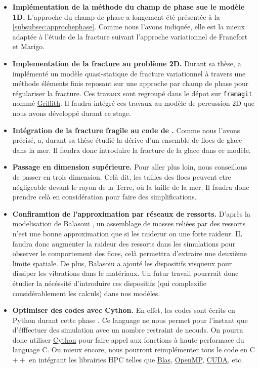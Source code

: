 \begin{itemize}
    \item \textbf{Implémentation de la méthode du champ de phase sue le modèle 1D.} L'approche du champ de phase a longement été présentée à la \cref{subsubsec:approchephase}. Comme nous l'avons indiquée, elle est la mieux adaptée à l'étude de la fracture suivant l'approche variationnel de Francfort et Marigo.
    \item \textbf{Implementation de la fracture au problème 2D.} Durant sa thèse, \citeauthor{balasoiu2020halthesis} a implémenté un modèle quasi-statique de fracture variationnel à travers une méthode éléments finis reposant sur une approche par champ de phase pour régulariser la fracture. Ces travaux sont regroupé dans le dépot sur \texttt{framagit} nommé \href{https://framagit.org/RaK/Griffith}{Griffith}. Il faudra intégré ces travaux au modèle de percussion 2D que nous avons développé durant ce stage.
    \item \textbf{Intégration de la fracture fragile au code de \citeauthor{rabatel2015thesis}.} Comme nous l'avons précisé, \citeauthor{rabatel2015thesis} a, durant sa thèse étudié la dérive d'un ensemble de floes de glace dans la mer. Il faudra donc introduire la fracture de la glace dans ce modèle.
    \item \textbf{Passage en dimension supérieure.} Pour aller plus loin, nous conseillons de passer en trois dimension. Celà dit, les tailles des floes peuvent etre négligeable devant le rayon de la Terre, où la taille de la mer. Il faudra donc prendre celà en considération pour faire des simplifications.
    \item \textbf{Confiramtion de l'approximation par réseaux de ressorts.} D'après la modelisation de Balasoui \parencite{balasoiu2020halthesis}, un assemblage de masses reliées par des ressorts n'est une bonne approximation que si les raiderur on une forte raideur. IL faudra donc augmenter la raideur des ressorts dans les simulations pour observer le comportement des floes, celà permettra d'extraire une deuxième limite spatiale. De plus, Balasoiu a ajouté les dispositifs visqueux pour dissiper les vibrations dans le matériaux. Un futur travail pourrrait donc étudier la nécéssité d'introduire ces dispositifs (qui complexifie considérablement les calculs) dans nos modèles.  
    \item \textbf{Optimiser des codes avec Cython.} En effet, les codes sont écrits en Python durant cette phase . Ce language ne nous permet pour l'instant que d'éfffectuer des simulation avec un nombre restraint de neouds. On pourra donc utiliser \href{https://cython.org/}{Cython} pour faire appel aux fonctions à haute performace du language C. Ou mieux encore, nous pourront reimplémenter tous le code en C$++$ en intégrant les librairies HPC telles que \href{http://www.netlib.org/blas/}{Blas}, \href{https://www.openmp.org/}{OpenMP}, \href{https://developer.nvidia.com/cuda-zone}{CUDA}, etc.

\end{itemize}
